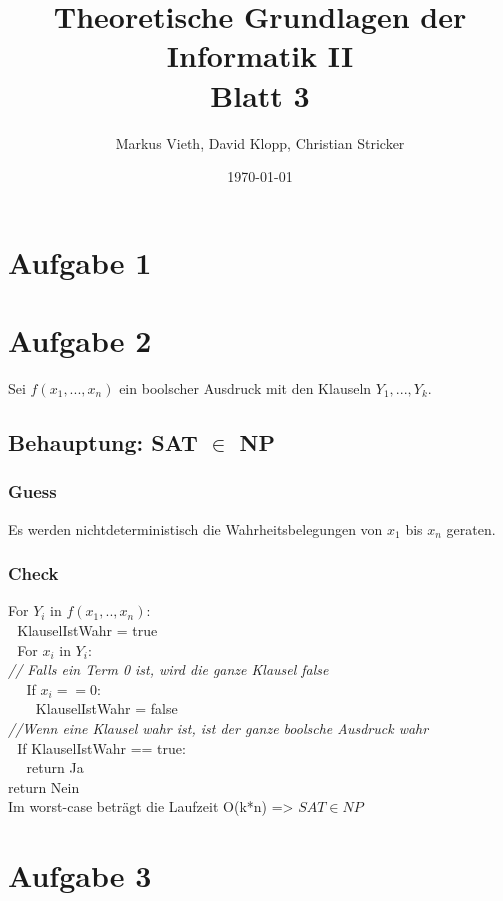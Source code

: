 \documentclass[a4paper,11pt,twoside]{article}
\title{Theoretische Grundlagen der Informatik II\\ Blatt 3}
\author{Markus Vieth, David Klopp, Christian Stricker}
\date{\today}
\begin{document}
\maketitle
\cleardoublepage
\pagestyle{myheadings}

\section*{Aufgabe 1}



\section*{Aufgabe 2}
Sei $f(x_1, ..., x_n)$ ein boolscher Ausdruck mit den Klauseln $Y_1, ..., Y_k$. 

\subsection*{Behauptung: SAT $\in$ NP}
\subsubsection*{Guess}
Es werden nichtdeterministisch die Wahrheitsbelegungen von $x_1$ bis $x_n$ geraten.
\subsubsection*{Check}

For $Y_i$ in $f(x_1,.., x_n)$:\\
$~~~$KlauselIstWahr = true\\
$~~~$For $x_i$ in $Y_i$:\\
\textit{// Falls ein Term 0 ist, wird die ganze Klausel false}\\
$~~~~~~$If $x_i == 0$:\\ 
$~~~~~~~~~$KlauselIstWahr = false\\
\textit{//Wenn eine Klausel wahr ist, ist der ganze boolsche Ausdruck wahr}\\
$~~~$If KlauselIstWahr == true:\\
$~~~~~~$return Ja\\
return Nein\\

Im worst-case beträgt die Laufzeit O(k*n) => $SAT \in NP$



\section*{Aufgabe 3}
\end{document}
